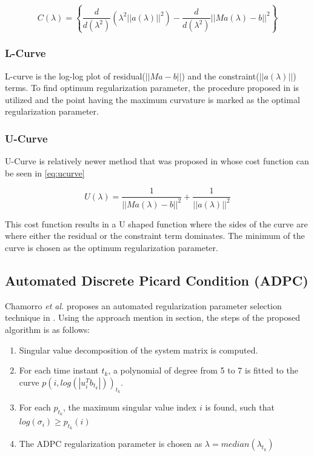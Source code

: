 \documentclass[draftcls, onecolumn, journal]{IEEEtran}
\begin{document}
\begin{equation}
    C(\lambda) = \left\{ \frac{d}{d(\lambda^2)}(\lambda^2||a(\lambda)||^2) -  \frac{d}{d(\lambda^2)}||Ma(\lambda) - b||^2 \right\}
\end{equation}

\subsubsection{L-Curve}

L-curve is the log-log plot of residual($||Ma-b||$) and the constraint($||a(\lambda)||$) terms. To find optimum regularization parameter, the procedure proposed in \cite*{hansen1993use} is utilized and the point having the maximum curvature is marked as the optimal regularization parameter. 

\subsubsection{U-Curve}

U-Curve is relatively newer method that was proposed in \cite*{krawczyk2007regularization} whose cost function can be seen in \eqref{eq:ucurve}

\begin{equation}
    U(\lambda) = \frac{1}{||Ma(\lambda)-b||^2} + \frac{1}{||a(\lambda)||^2}
    \label{eq:ucurve}
\end{equation}

This cost function results in a U shaped function where the sides of the curve are where either the residual or the constraint term dominates. The minimum of the curve is chosen as the optimum regularization parameter. 

\newpage

\subsection{Automated Discrete Picard Condition (ADPC)}

Chamorro \textit{et al.} proposes an automated regularization parameter selection technique in \cite*{chamorro2017improving}. Using the approach mention in  section, the steps of the proposed algorithm is as follows: 

\begin{enumerate}
    \item Singular value decomposition of the system matrix is computed.
    \item For each time instant $t_k$, a polynomial of degree from 5 to 7 is fitted to the curve $p(i,log(|u_i^Tb_{t_k}|))_{t_k}$.
    \item For each $p_{t_k}$, the maximum singular value index $i$ is found, such that $log(\sigma_i) \geq p_{t_k}(i)$
    \item The ADPC regularization parameter is chosen as $\lambda = median({\lambda_{t_k}})$
\end{enumerate}
\end{document}

